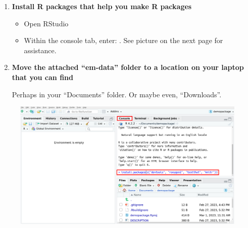 \documentclass{article}
\begin{document}
\begin{enumerate}
    \item \textbf{Install R packages that help you make R packages}
        \begin{itemize}
            \item Open RStudio
            \item Within the console tab, enter: \newline {}.
                See picture on the next page for assistance.
        \end{itemize}

    \item \textbf{Move the attached ``em-data'' folder to a location on your laptop that you can find}

        Perhaps in your ``Documents'' folder. Or maybe even, ``Downloads''.
\end{enumerate}

\begin{figure}
\center
\includegraphics[width=\textwidth]{./install_packages.png}
\end{figure}
\end{document}
